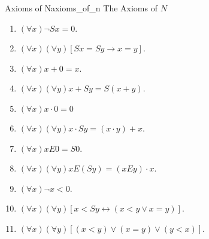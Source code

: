\begin{definition}
{Axioms of N}{axioms_of_n}
The Axioms of \(N\)
\begin{enumerate}
    \item \((\forall x) \neg S x = 0\).
    \item \((\forall x)(\forall y)[S x = S y \rightarrow x = y]\).
    \item \((\forall x) x+0 = x\).
    \item \((\forall x)(\forall y) x+S y = S(x+y)\).
    \item \((\forall x) x \cdot 0 = 0\)
    \item \((\forall x)(\forall y) x \cdot S y = (x \cdot y)+x\).
    \item \((\forall x) x E 0 = S 0\).
    \item \((\forall x)(\forall y) x E(S y) = (x E y) \cdot x\).
    \item \((\forall x) \neg x<0\).
    \item \((\forall x)(\forall y)[x<S y \leftrightarrow(x<y \vee x = y)] \).
    \item \((\forall x)(\forall y)[(x<y) \vee(x = y) \vee(y<x)]\).
\end{enumerate}
\end{definition}
